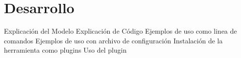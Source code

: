 \section{Desarrollo}

Explicación del Modelo
Explicación de Código
Ejemplos de uso como linea de comandos
Ejemplos de uso con archivo de configuración
Instalación de la herramienta como plugins
Uso del plugin

